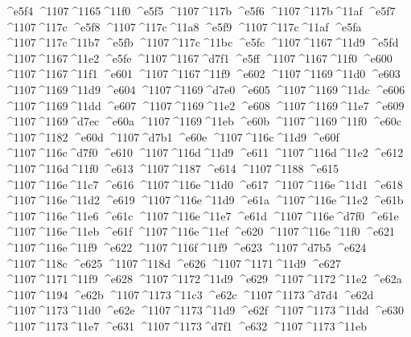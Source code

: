 \checkit ^^^^e5f4 ^^^^1107^^^^1165^^^^11f0
\checkit ^^^^e5f5 ^^^^1107^^^^117b
\checkit ^^^^e5f6 ^^^^1107^^^^117b^^^^11af
\checkit ^^^^e5f7 ^^^^1107^^^^117c
\checkit ^^^^e5f8 ^^^^1107^^^^117c^^^^11a8
\checkit ^^^^e5f9 ^^^^1107^^^^117c^^^^11af
\checkit ^^^^e5fa ^^^^1107^^^^117c^^^^11b7
\checkit ^^^^e5fb ^^^^1107^^^^117c^^^^11bc
\checkit ^^^^e5fc ^^^^1107^^^^1167^^^^11d9
\checkit ^^^^e5fd ^^^^1107^^^^1167^^^^11e2
\checkit ^^^^e5fe ^^^^1107^^^^1167^^^^d7f1
\checkit ^^^^e5ff ^^^^1107^^^^1167^^^^11f0
\checkit ^^^^e600 ^^^^1107^^^^1167^^^^11f1
\checkit ^^^^e601 ^^^^1107^^^^1167^^^^11f9
\checkit ^^^^e602 ^^^^1107^^^^1169^^^^11d0
\checkit ^^^^e603 ^^^^1107^^^^1169^^^^11d9
\checkit ^^^^e604 ^^^^1107^^^^1169^^^^d7e0
\checkit ^^^^e605 ^^^^1107^^^^1169^^^^11dc
\checkit ^^^^e606 ^^^^1107^^^^1169^^^^11dd
\checkit ^^^^e607 ^^^^1107^^^^1169^^^^11e2
\checkit ^^^^e608 ^^^^1107^^^^1169^^^^11e7
\checkit ^^^^e609 ^^^^1107^^^^1169^^^^d7ec
\checkit ^^^^e60a ^^^^1107^^^^1169^^^^11eb
\checkit ^^^^e60b ^^^^1107^^^^1169^^^^11f0
\checkit ^^^^e60c ^^^^1107^^^^1182
\checkit ^^^^e60d ^^^^1107^^^^d7b1
\checkit ^^^^e60e ^^^^1107^^^^116c^^^^11d9
\checkit ^^^^e60f ^^^^1107^^^^116c^^^^d7f0
\checkit ^^^^e610 ^^^^1107^^^^116d^^^^11d9
\checkit ^^^^e611 ^^^^1107^^^^116d^^^^11e2
\checkit ^^^^e612 ^^^^1107^^^^116d^^^^11f0
\checkit ^^^^e613 ^^^^1107^^^^1187
\checkit ^^^^e614 ^^^^1107^^^^1188
\checkit ^^^^e615 ^^^^1107^^^^116e^^^^11c7
\checkit ^^^^e616 ^^^^1107^^^^116e^^^^11d0
\checkit ^^^^e617 ^^^^1107^^^^116e^^^^11d1
\checkit ^^^^e618 ^^^^1107^^^^116e^^^^11d2
\checkit ^^^^e619 ^^^^1107^^^^116e^^^^11d9
\checkit ^^^^e61a ^^^^1107^^^^116e^^^^11e2
\checkit ^^^^e61b ^^^^1107^^^^116e^^^^11e6
\checkit ^^^^e61c ^^^^1107^^^^116e^^^^11e7
\checkit ^^^^e61d ^^^^1107^^^^116e^^^^d7f0
\checkit ^^^^e61e ^^^^1107^^^^116e^^^^11eb
\checkit ^^^^e61f ^^^^1107^^^^116e^^^^11ef
\checkit ^^^^e620 ^^^^1107^^^^116e^^^^11f0
\checkit ^^^^e621 ^^^^1107^^^^116e^^^^11f9
\checkit ^^^^e622 ^^^^1107^^^^116f^^^^11f9
\checkit ^^^^e623 ^^^^1107^^^^d7b5
\checkit ^^^^e624 ^^^^1107^^^^118c
\checkit ^^^^e625 ^^^^1107^^^^118d
\checkit ^^^^e626 ^^^^1107^^^^1171^^^^11d9
\checkit ^^^^e627 ^^^^1107^^^^1171^^^^11f9
\checkit ^^^^e628 ^^^^1107^^^^1172^^^^11d9
\checkit ^^^^e629 ^^^^1107^^^^1172^^^^11e2
\checkit ^^^^e62a ^^^^1107^^^^1194
\checkit ^^^^e62b ^^^^1107^^^^1173^^^^11c3
\checkit ^^^^e62c ^^^^1107^^^^1173^^^^d7d4
\checkit ^^^^e62d ^^^^1107^^^^1173^^^^11d0
\checkit ^^^^e62e ^^^^1107^^^^1173^^^^11d9
\checkit ^^^^e62f ^^^^1107^^^^1173^^^^11dd
\checkit ^^^^e630 ^^^^1107^^^^1173^^^^11e7
\checkit ^^^^e631 ^^^^1107^^^^1173^^^^d7f1
\checkit ^^^^e632 ^^^^1107^^^^1173^^^^11eb
